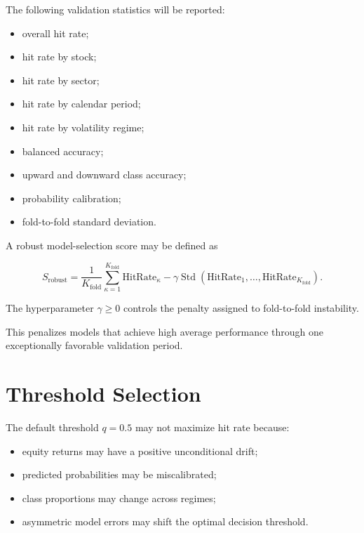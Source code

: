 \documentclass[11pt]{article}
\begin{document}
The following validation statistics will be reported:

\begin{itemize}
    \item overall hit rate;
    \item hit rate by stock;
    \item hit rate by sector;
    \item hit rate by calendar period;
    \item hit rate by volatility regime;
    \item balanced accuracy;
    \item upward and downward class accuracy;
    \item probability calibration;
    \item fold-to-fold standard deviation.
\end{itemize}

A robust model-selection score may be defined as

\begin{equation}
S_{\mathrm{robust}}
=
\frac{1}{K_{\mathrm{fold}}}
\sum_{\kappa=1}^{K_{\mathrm{fold}}}
\mathrm{HitRate}_\kappa
-
\gamma
\operatorname{Std}
\left(
\mathrm{HitRate}_1,
\ldots,
\mathrm{HitRate}_{K_{\mathrm{fold}}}
\right).
\end{equation}

The hyperparameter $\gamma\geq 0$ controls the penalty assigned to
fold-to-fold instability.

This penalizes models that achieve high average performance through one
exceptionally favorable validation period.

\section{Threshold Selection}

The default threshold $q=0.5$ may not maximize hit rate because:

\begin{itemize}
    \item equity returns may have a positive unconditional drift;
    \item predicted probabilities may be miscalibrated;
    \item class proportions may change across regimes;
    \item asymmetric model errors may shift the optimal decision threshold.
\end{itemize}
\end{document}
